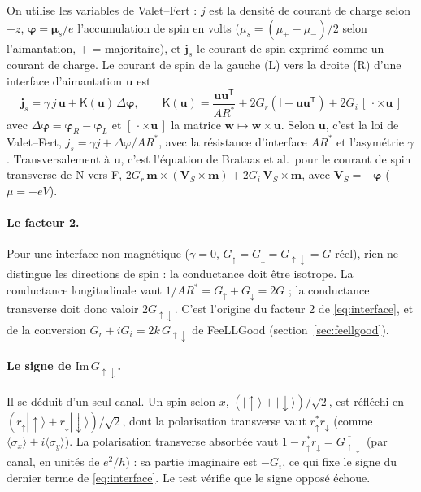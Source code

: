 \documentclass[11pt,a4paper]{article}
\newcommand{\vm}{\bm{m}}
\newcommand{\vu}{\bm{u}}
\newcommand{\vphi}{\bm{\varphi}}
\newcommand{\Id}{\mathsf{I}}
\newcommand{\mK}{\mathsf{K}}
\begin{document}
On utilise les variables de Valet--Fert : $j$ est la densité de courant de
charge selon $+z$, $\vphi = \bm{\mu}_s/e$ l'accumulation de spin en volts
($\mu_s = (\mu_+-\mu_-)/2$ selon l'aimantation, $+$ = majoritaire), et
$\bm{j}_s$ le courant de spin exprimé comme un courant de charge. Le
courant de spin de la gauche (L) vers la droite (R) d'une interface
d'aimantation $\vu$ est
\begin{equation}
  \boxed{\;\bm{j}_s = \gamma\,j\,\vu + \mK(\vu)\,\Delta\vphi,
  \qquad
  \mK(\vu) = \frac{\vu\vu^{\mathsf{T}}}{AR^*}
    + 2G_r\left(\Id-\vu\vu^{\mathsf{T}}\right)
    + 2G_i\,[\,\cdot\times\vu\,]\;}
  \label{eq:interface}
\end{equation}
avec $\Delta\vphi = \vphi_R-\vphi_L$ et $[\,\cdot\times\vu\,]$ la matrice
$\bm{w}\mapsto\bm{w}\times\vu$. Selon $\vu$, c'est la loi de Valet--Fert,
$j_s = \gamma j + \Delta\varphi/AR^*$, avec la résistance d'interface
$AR^*$ et l'asymétrie $\gamma$. Transversalement à $\vu$, c'est l'équation
de Brataas et al.\ pour le courant de spin transverse de N vers F,
$2G_r\,\vm\times(\bm{V}_S\times\vm) + 2G_i\,\bm{V}_S\times\vm$, avec
$\bm{V}_S = -\vphi$ ($\mu = -eV$).

\paragraph{Le facteur 2.} Pour une interface non magnétique ($\gamma = 0$,
$G_\uparrow = G_\downarrow = G_{\uparrow\downarrow} = G$ réel), rien ne
distingue les directions de spin : la conductance doit être isotrope. La
conductance longitudinale vaut $1/AR^* = G_\uparrow+G_\downarrow = 2G$ ; la
conductance transverse doit donc valoir $2G_{\uparrow\downarrow}$. C'est
l'origine du facteur 2 de \eqref{eq:interface}, et de la conversion
$G_r + iG_i = 2k\,G_{\uparrow\downarrow}$ de FeeLLGood
(section~\ref{sec:feellgood}).

\paragraph{Le signe de $\mathrm{Im}\,G_{\uparrow\downarrow}$.} Il se
déduit d'un seul canal. Un spin selon $x$, $(|{\uparrow}\rangle +
|{\downarrow}\rangle)/\sqrt2$, est réfléchi en
$(r_\uparrow|{\uparrow}\rangle + r_\downarrow|{\downarrow}\rangle)/\sqrt2$,
dont la polarisation transverse vaut $r_\uparrow^*r_\downarrow$ (comme
$\langle\sigma_x\rangle + i\langle\sigma_y\rangle$). La polarisation
transverse absorbée vaut $1 - r_\uparrow^*r_\downarrow =
\overline{G_{\uparrow\downarrow}}$ (par canal, en unités de $e^2/h$) : sa
partie imaginaire est $-G_i$, ce qui fixe le signe du dernier terme de
\eqref{eq:interface}. Le test vérifie que le signe opposé échoue.
\end{document}
